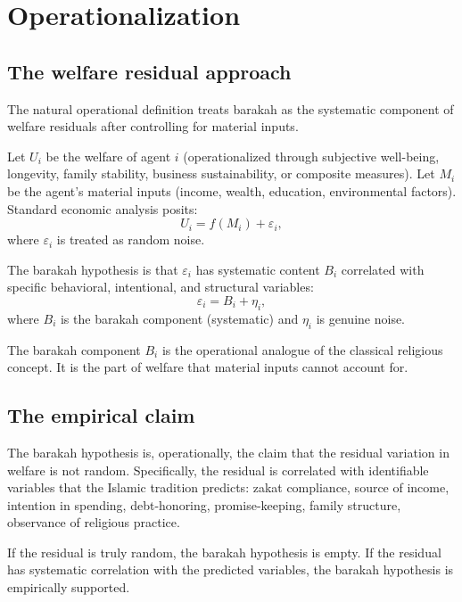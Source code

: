 \section{Operationalization}
\label{sec:bar-operationalization}

\subsection{The welfare residual approach}

The natural operational definition treats barakah as the systematic
component of welfare residuals after controlling for material
inputs.

\begin{conceptbox}
\label{conc:bar-operational}
Let $U_i$ be the welfare of agent $i$ (operationalized through
subjective well-being, longevity, family stability, business
sustainability, or composite measures). Let $M_i$ be the agent's
material inputs (income, wealth, education, environmental
factors). Standard economic analysis posits:
\[
    U_i = f(M_i) + \varepsilon_i,
\]
where $\varepsilon_i$ is treated as random noise.

The barakah hypothesis is that $\varepsilon_i$ has systematic
content $B_i$ correlated with specific behavioral, intentional,
and structural variables:
\[
    \varepsilon_i = B_i + \eta_i,
\]
where $B_i$ is the barakah component (systematic) and $\eta_i$ is
genuine noise.
\end{conceptbox}

The barakah component $B_i$ is the operational analogue of the
classical religious concept. It is the part of welfare that
material inputs cannot account for.

\subsection{The empirical claim}

The barakah hypothesis is, operationally, the claim that the
residual variation in welfare is not random. Specifically, the
residual is correlated with identifiable variables that the
Islamic tradition predicts: zakat compliance, source of income,
intention in spending, debt-honoring, promise-keeping, family
structure, observance of religious practice.

If the residual is truly random, the barakah hypothesis is
empty. If the residual has systematic correlation with the
predicted variables, the barakah hypothesis is empirically
supported.

